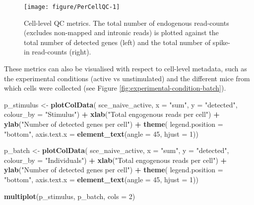 \documentclass[9pt,a4paper,]{extarticle}
\newenvironment{Shaded}{\begin{snugshade}}{\end{snugshade}}
\newcommand{\DataTypeTok}[1]{\textcolor[rgb]{0.13,0.29,0.53}{#1}}
\newcommand{\DecValTok}[1]{\textcolor[rgb]{0.00,0.00,0.81}{#1}}
\newcommand{\KeywordTok}[1]{\textcolor[rgb]{0.13,0.29,0.53}{\textbf{#1}}}
\newcommand{\NormalTok}[1]{#1}
\newcommand{\OperatorTok}[1]{\textcolor[rgb]{0.81,0.36,0.00}{\textbf{#1}}}
\newcommand{\StringTok}[1]{\textcolor[rgb]{0.31,0.60,0.02}{#1}}
\begin{document}
\begin{figure}

{\centering \texttt{[image: figure/PerCellQC-1]} 

}

\caption{Cell-level QC metrics. The total number of endogenous read-counts (excludes non-mapped and intronic reads) is plotted against the total number of detected genes (left) and the total number of spike-in read-counts (right).}\label{fig:PerCellQC}
\end{figure}

These metrics can also be visualised with respect to cell-level metadata, such
as the experimental conditions (active vs unstimulated) and the different mice
from which cells were collected (see Figure \ref{fig:experimental-condition-batch}).

\begin{Shaded}
\begin{Highlighting}[]
\NormalTok{p_stimulus <-}\StringTok{ }\KeywordTok{plotColData}\NormalTok{(}
\NormalTok{    sce_naive_active,}
    \DataTypeTok{x =} \StringTok{"sum"}\NormalTok{,}
    \DataTypeTok{y =} \StringTok{"detected"}\NormalTok{, }
    \DataTypeTok{colour_by =} \StringTok{"Stimulus"}\NormalTok{) }\OperatorTok{+}
\StringTok{  }\KeywordTok{xlab}\NormalTok{(}\StringTok{"Total engogenous reads per cell"}\NormalTok{) }\OperatorTok{+}
\StringTok{  }\KeywordTok{ylab}\NormalTok{(}\StringTok{"Number of detected genes per cell"}\NormalTok{) }\OperatorTok{+}
\StringTok{  }\KeywordTok{theme}\NormalTok{(}
    \DataTypeTok{legend.position =} \StringTok{"bottom"}\NormalTok{,}
    \DataTypeTok{axis.text.x =} \KeywordTok{element_text}\NormalTok{(}\DataTypeTok{angle =} \DecValTok{45}\NormalTok{, }\DataTypeTok{hjust =} \DecValTok{1}\NormalTok{))}

\NormalTok{p_batch <-}\StringTok{ }\KeywordTok{plotColData}\NormalTok{(}
\NormalTok{    sce_naive_active,}
    \DataTypeTok{x =} \StringTok{"sum"}\NormalTok{,}
    \DataTypeTok{y =} \StringTok{"detected"}\NormalTok{, }
    \DataTypeTok{colour_by =} \StringTok{"Individuals"}\NormalTok{) }\OperatorTok{+}
\StringTok{  }\KeywordTok{xlab}\NormalTok{(}\StringTok{"Total engogenous reads per cell"}\NormalTok{) }\OperatorTok{+}
\StringTok{  }\KeywordTok{ylab}\NormalTok{(}\StringTok{"Number of detected genes per cell"}\NormalTok{) }\OperatorTok{+}
\StringTok{  }\KeywordTok{theme}\NormalTok{(}
    \DataTypeTok{legend.position =} \StringTok{"bottom"}\NormalTok{,}
    \DataTypeTok{axis.text.x =} \KeywordTok{element_text}\NormalTok{(}\DataTypeTok{angle =} \DecValTok{45}\NormalTok{, }\DataTypeTok{hjust =} \DecValTok{1}\NormalTok{))}

\KeywordTok{multiplot}\NormalTok{(p_stimulus, p_batch, }\DataTypeTok{cols =} \DecValTok{2}\NormalTok{)}
\end{Highlighting}
\end{Shaded}
\end{document}
